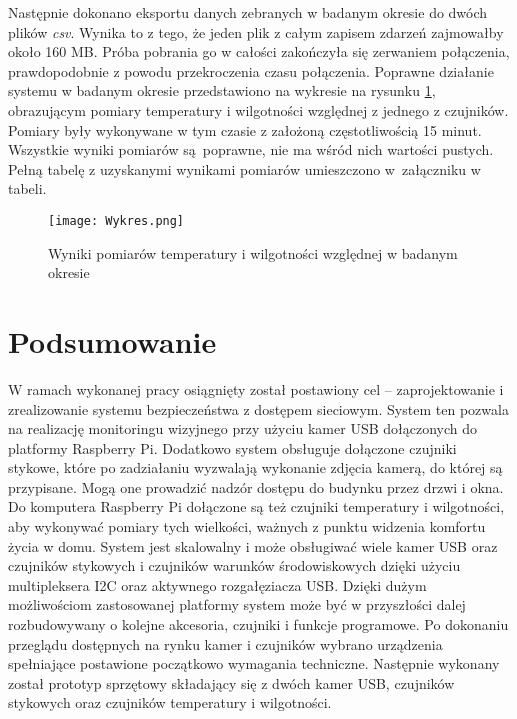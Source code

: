 \documentclass[a4paper,11pt,twoside]{article}
\begin{document}
Następnie dokonano eksportu danych zebranych w badanym okresie do dwóch plików \textit{csv}. Wynika to z tego, że jeden plik z całym zapisem zdarzeń zajmowałby około 160 MB. Próba pobrania go w całości zakończyła się zerwaniem połączenia, prawdopodobnie z powodu przekroczenia czasu połączenia. Poprawne działanie systemu w badanym okresie przedstawiono na wykresie na rysunku \ref{fig: test_pomiary}, obrazującym pomiary temperatury i wilgotności względnej z jednego z czujników. Pomiary były wykonywane w tym czasie z założoną częstotliwością 15 minut. Wszystkie wyniki pomiarów są~poprawne, nie ma wśród nich wartości pustych. Pełną tabelę z uzyskanymi wynikami pomiarów umieszczono w~załączniku w tabeli.

\begin{figure}[H]
\begin{center}
\texttt{[image: Wykres.png]}
\caption{Wyniki pomiarów temperatury i wilgotności względnej w badanym okresie}
\label{fig: test_pomiary}
\end{center}
\end{figure}


\newpage
\section{Podsumowanie}
W ramach wykonanej pracy osiągnięty został postawiony cel -- zaprojektowanie i zrealizowanie systemu bezpieczeństwa z dostępem sieciowym. System ten pozwala na realizację monitoringu wizyjnego przy użyciu kamer USB dołączonych do platformy Raspberry Pi. Dodatkowo system obsługuje dołączone czujniki stykowe, które po zadziałaniu wyzwalają wykonanie zdjęcia kamerą, do której są przypisane. Mogą one prowadzić nadzór dostępu do budynku przez drzwi i okna. Do komputera Raspberry Pi dołączone są też czujniki temperatury i wilgotności, aby wykonywać pomiary tych wielkości, ważnych z punktu widzenia komfortu życia w domu. System jest skalowalny i może obsługiwać wiele kamer USB oraz czujników stykowych i czujników warunków środowiskowych dzięki użyciu multipleksera I2C oraz aktywnego rozgałęziacza USB. Dzięki dużym możliwościom zastosowanej platformy system może być w przyszłości dalej rozbudowywany o kolejne akcesoria, czujniki i funkcje programowe. Po dokonaniu przeglądu dostępnych na rynku kamer i czujników wybrano urządzenia spełniające postawione początkowo wymagania techniczne. Następnie wykonany został prototyp sprzętowy składający się z dwóch kamer USB, czujników stykowych oraz czujników temperatury i wilgotności.
\end{document}
